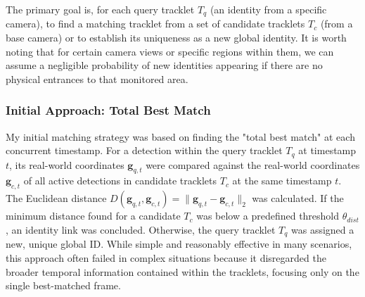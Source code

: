 \documentclass[12pt, a4paper]{article}
\begin{document}
The primary goal is, for each query tracklet $T_q$ (an identity from a specific camera), to find a matching tracklet from a set of candidate tracklets $T_c$ (from a base camera) or to establish its uniqueness as a new global identity. It is worth noting that for certain camera views or specific regions within them, we can assume a negligible probability of new identities appearing if there are no physical entrances to that monitored area.

\subsubsection{Initial Approach: Total Best Match}
My initial matching strategy was based on finding the "total best match" at each concurrent timestamp. For a detection within the query tracklet $T_q$ at timestamp $t$, its real-world coordinates $\mathbf{g}_{q,t}$ were compared against the real-world coordinates $\mathbf{g}_{c,t}$ of all active detections in candidate tracklets $T_c$ at the same timestamp $t$. The Euclidean distance $D(\mathbf{g}_{q,t}, \mathbf{g}_{c,t}) = \| \mathbf{g}_{q,t} - \mathbf{g}_{c,t} \|_2$ was calculated. If the minimum distance found for a candidate $T_c$ was below a predefined threshold $\theta_{dist}$, an identity link was concluded. Otherwise, the query tracklet $T_q$ was assigned a new, unique global ID. While simple and reasonably effective in many scenarios, this approach often failed in complex situations because it disregarded the broader temporal information contained within the tracklets, focusing only on the single best-matched frame.
\end{document}
